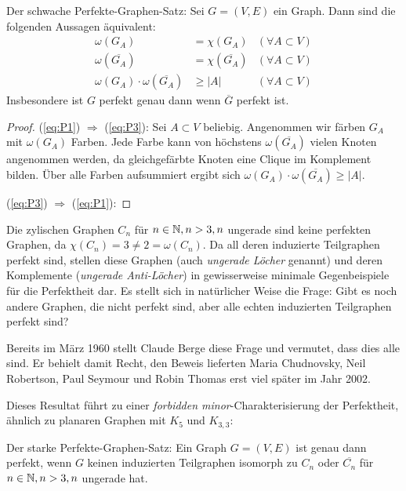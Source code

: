 \documentclass[../main.tex]{subfiles}
\begin{document}
\begin{satz}
    \label{thm:wpgt}
    Der schwache Perfekte-Graphen-Satz: Sei $G = (V, E)$ ein Graph. Dann sind die folgenden Aussagen äquivalent:
    \begin{align}
        \omega(G_A) &= \chi(G_A) &(\forall A \subset V) \tag{P1}\label{eq:P1}\\
        \omega(\overline{G_A}) &= \chi(\overline{G_A}) &(\forall A \subset V) \tag{P2}\label{eq:P2}\\
        \omega(G_A) \cdot \omega(\overline{G_A}) &\geq |A| &(\forall A \subset V) \tag{P3}\label{eq:P3}
    \end{align}
    Insbesondere ist $G$ perfekt genau dann wenn $\overline G$ perfekt ist.
\end{satz}
\begin{proof}
    (\ref{eq:P1}) $\Rightarrow$ (\ref{eq:P3}): Sei $A \subset V$ beliebig. Angenommen wir färben $G_A$ mit $\omega(G_A)$ Farben. Jede Farbe kann von höchstens $\omega(\overline{G_A})$ vielen Knoten angenommen werden, da gleichgefärbte Knoten eine Clique im Komplement bilden. Über alle Farben aufsummiert ergibt sich $\omega(G_A) \cdot \omega(\overline{G_A}) \geq |A|$.

    (\ref{eq:P3}) $\Rightarrow$ (\ref{eq:P1}): 
\end{proof}

Die zylischen Graphen $C_n$ für $n \in \mathbb{N}, n > 3, n$ ungerade sind keine perfekten Graphen, da $\chi(C_n) = 3 \neq 2 = \omega(C_n)$. Da all deren induzierte Teilgraphen perfekt sind, stellen diese Graphen (auch \emph{ungerade Löcher} genannt) und deren Komplemente (\emph{ungerade Anti-Löcher}) in gewisserweise minimale Gegenbeispiele für die Perfektheit dar. Es stellt sich in natürlicher Weise die Frage: Gibt es noch andere Graphen, die nicht perfekt sind, aber alle echten induzierten Teilgraphen perfekt sind?

Bereits im März 1960 stellt Claude Berge diese Frage und vermutet, dass dies alle sind.\cite{das_Buch} Er behielt damit Recht, den Beweis lieferten Maria Chudnovsky, Neil Robertson, Paul Seymour und Robin Thomas\cite{chudnovsky2002strongperfectgraphtheorem} erst viel später im Jahr 2002.

Dieses Resultat führt zu einer \emph{forbidden minor}-Charakterisierung der Perfektheit, ähnlich zu planaren Graphen mit $K_5$ und $K_{3,3}$:

\begin{satz}
    \label{thm:spgt}
    Der starke Perfekte-Graphen-Satz: Ein Graph $G = (V, E)$ ist genau dann perfekt, wenn $G$ keinen induzierten Teilgraphen isomorph zu $C_n$ oder $\overline{C_n}$ für $n \in \mathbb{N}, n > 3, n$ ungerade hat.
\end{satz}


\end{document}
